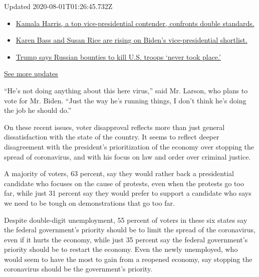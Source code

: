 Updated 2020-08-01T01:26:45.732Z

\begin{itemize}
\tightlist
\item
  \href{https://www.nytimes3xbfgragh.onion/2020/07/31/us/elections/biden-vs-trump.html?action=click\&pgtype=Article\&state=default\&region=MAIN_CONTENT_1\&context=storylines_live_updates\#link-29fdff45}{Kamala
  Harris, a top vice-presidential contender, confronts double
  standards.}
\item
  \href{https://www.nytimes3xbfgragh.onion/2020/07/31/us/elections/biden-vs-trump.html?action=click\&pgtype=Article\&state=default\&region=MAIN_CONTENT_1\&context=storylines_live_updates\#link-13ec3d9c}{Karen
  Bass and Susan Rice are rising on Biden's vice-presidential
  shortlist.}
\item
  \href{https://www.nytimes3xbfgragh.onion/2020/07/31/us/elections/biden-vs-trump.html?action=click\&pgtype=Article\&state=default\&region=MAIN_CONTENT_1\&context=storylines_live_updates\#link-49e9a016}{Trump
  says Russian bounties to kill U.S. troops `never took place.'}
\end{itemize}

\href{https://www.nytimes3xbfgragh.onion/2020/07/31/us/elections/biden-vs-trump.html?action=click\&pgtype=Article\&state=default\&region=MAIN_CONTENT_1\&context=storylines_live_updates}{See
more updates}

``He's not doing anything about this here virus,'' said Mr. Larson, who
plans to vote for Mr. Biden. ``Just the way he's running things, I don't
think he's doing the job he should do.''

On these recent issues, voter disapproval reflects more than just
general dissatisfaction with the state of the country. It seems to
reflect deeper disagreement with the president's prioritization of the
economy over stopping the spread of coronavirus, and with his focus on
law and order over criminal justice.

A majority of voters, 63 percent, say they would rather back a
presidential candidate who focuses on the cause of protests, even when
the protests go too far, while just 31 percent say they would prefer to
support a candidate who says we need to be tough on demonstrations that
go too far.

Despite double-digit unemployment, 55 percent of voters in these six
states say the federal government's priority should be to limit the
spread of the coronavirus, even if it hurts the economy, while just 35
percent say the federal government's priority should be to restart the
economy. Even the newly unemployed, who would seem to have the most to
gain from a reopened economy, say stopping the coronavirus should be the
government's priority.

